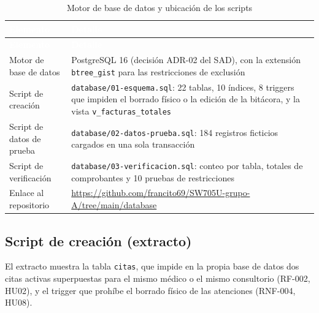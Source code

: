 \documentclass[11pt,a4paper]{article}
\newcommand{\cab}[1]{\textcolor{white}{\textbf{#1}}}
\newcommand{\tb}[1]{{\renewcommand{\_}{\textunderscore\allowbreak}\texttt{#1}}}
\begin{document}
\begin{xltabular}{\linewidth}{|P{4.5cm}|L|}
  \caption{Motor de base de datos y ubicación de los scripts}\label{tab:archivos-sql}\\
  \hline
  \cab{Elemento} & \cab{Detalle} \\ \hline
  \endfirsthead
  \hline
  \cab{Elemento} & \cab{Detalle} \\ \hline
  \endhead
  Motor de base de datos     & PostgreSQL 16 (decisión ADR-02 del SAD), con la extensión
                               \texttt{btree\_gist} para las restricciones de exclusión \\ \hline
  Script de creación         & \nolinkurl{database/01-esquema.sql}: 22 tablas, 10 índices,
                               8 triggers que impiden el borrado físico o la edición de la
                               bitácora, y la vista \texttt{v\_facturas\_totales} \\ \hline
  Script de datos de prueba  & \nolinkurl{database/02-datos-prueba.sql}: 184 registros ficticios
                               cargados en una sola transacción \\ \hline
  Script de verificación     & \nolinkurl{database/03-verificacion.sql}: conteo por tabla,
                               totales de comprobantes y 10 pruebas de restricciones \\ \hline
  Enlace al repositorio      & \url{https://github.com/francito69/SW705U-grupo-A/tree/main/database} \\ \hline
\end{xltabular}

\subsection{Script de creación (extracto)}

El extracto muestra la tabla \tb{citas}, que impide en la propia base de datos dos citas activas
superpuestas para el mismo médico o el mismo consultorio (RF-002, HU02), y el trigger que
prohíbe el borrado físico de las atenciones (RNF-004, HU08).
\end{document}
